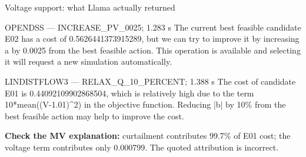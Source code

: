 \begin{frame}[t]{Voltage support: what Llama actually returned}
\begin{block}{OPENDSS --- INCREASE\_PV\_0025; 1.283 s}
\footnotesize The current best feasible candidate E02 has a cost of 0.5626441373915289, but we can try to improve it by increasing a by 0.0025 from the best feasible action. This operation is available and selecting it will request a new simulation automatically.\end{block}
\begin{block}{LINDISTFLOW3 --- RELAX\_Q\_10\_PERCENT; 1.388 s}
\footnotesize The cost of candidate E01 is 0.44092109902868504, which is relatively high due to the term 10*mean((V-1.01)\textasciicircum{}2) in the objective function. Reducing |b| by 10\% from the best feasible action may help to improve the cost.\end{block}\small \textbf{Check the MV explanation:} curtailment contributes 99.7\% of E01 cost; the voltage term contributes only 0.000799. The quoted attribution is incorrect.
\end{frame}

